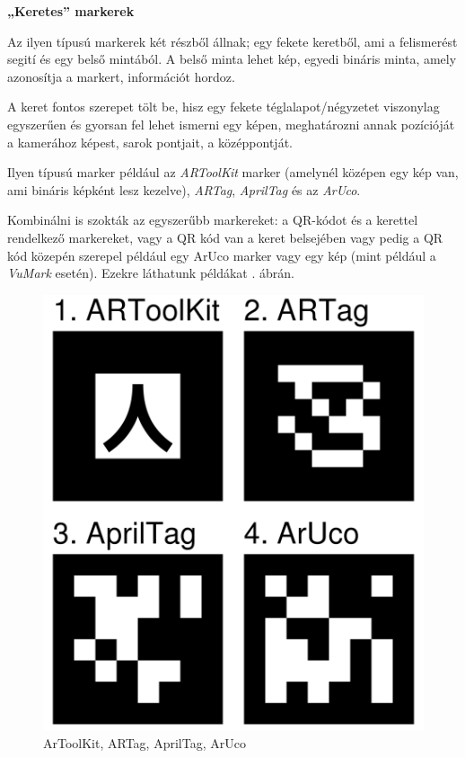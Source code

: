 \bigskip

\noindent \textbf{„Keretes” markerek}

\medskip

Az ilyen típusú markerek két részből állnak; egy fekete keretből, ami a felismerést segití és egy belső mintából. A belső minta lehet kép, egyedi bináris minta, amely azonosítja a markert, információt hordoz.

A keret fontos szerepet tölt be, hisz egy fekete téglalapot/négyzetet viszonylag egyszerűen és gyorsan fel lehet ismerni egy képen, meghatározni annak pozícióját a kamerához képest, sarok pontjait, a középpontját.

Ilyen típusú marker például az \textit{ARToolKit} marker (amelynél középen egy kép van, ami bináris képként lesz kezelve), \textit{ARTag}, \textit{AprilTag} és az \textit{ArUco}.

Kombinálni is szokták az egyszerűbb markereket: a QR-kódot és a kerettel rendelkező markereket, vagy a QR kód van a keret belsejében vagy pedig a QR kód közepén szerepel például egy ArUco marker vagy egy kép (mint például a \textit{VuMark} esetén).
Ezekre láthatunk példákat . ábrán.

\begin{figure}[htp]
    \centering
   	\includegraphics[scale=0.25]{images/markerek.png}
	\caption{ArToolKit, ARTag, AprilTag, ArUco}
	\label{fig:markerek}
\end{figure}

